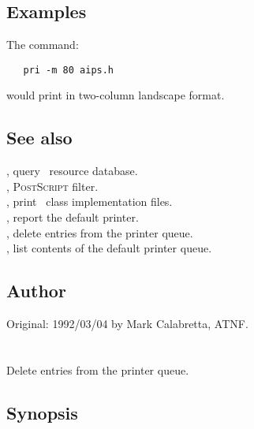\subsection*{Examples}

The command:

\begin{verbatim}
   pri -m 80 aips.h
\end{verbatim}

\noindent
would print  in two-column landscape format.

\subsection*{See also}

, query \aipspp\ resource database.\\
, \textsc{PostScript} filter.\\
, print \aipspp\ class implementation files.\\
, report the default printer.\\
, delete entries from the printer queue.\\
, list contents of the default printer queue.

\subsection*{Author}

Original: 1992/03/04 by Mark Calabretta, ATNF.


\newpage
\section{}
\label{prm}

Delete entries from the printer queue.

\subsection*{Synopsis}

\begin{synopsis}
\end{synopsis}

